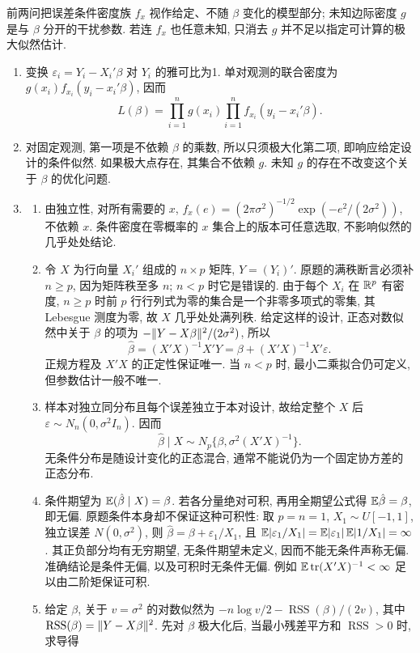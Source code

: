 \begin{solution}
前两问把误差条件密度族 $f_x$ 视作给定、不随 $\beta$ 变化的模型部分; 未知边际密度 $g$ 是与 $\beta$ 分开的干扰参数. 若连 $f_x$ 也任意未知, 只消去 $g$ 并不足以指定可计算的极大似然估计.
\begin{enumerate}[label=\arabic*.]
\item 变换 $\varepsilon_i=Y_i-X_i'\beta$ 对 $Y_i$ 的雅可比为1. 单对观测的联合密度为 $g(x_i)f_{x_i}(y_i-x_i'\beta)$, 因而
\[
L(\beta)=\prod_{i=1}^ng(x_i)\prod_{i=1}^nf_{x_i}(y_i-x_i'\beta).
\]
\item 对固定观测, 第一项是不依赖 $\beta$ 的乘数, 所以只须极大化第二项, 即响应给定设计的条件似然. 如果极大点存在, 其集合不依赖 $g$. 未知 $g$ 的存在不改变这个关于 $\beta$ 的优化问题.
\item
\begin{enumerate}[label=\alph*)]
\item 由独立性, 对所有需要的 $x$, $f_x(e)=(2\pi\sigma^2)^{-1/2}\exp(-e^2/(2\sigma^2))$, 不依赖 $x$. 条件密度在零概率的 $x$ 集合上的版本可任意选取, 不影响似然的几乎处处结论.
\item 令 $X$ 为行向量 $X_i'$ 组成的 $n\times p$ 矩阵, $Y=(Y_i)'$. 原题的满秩断言必须补 $n\ge p$, 因为矩阵秩至多 $n$; $n<p$ 时它是错误的. 由于每个 $X_i$ 在 $\mathbb R^p$ 有密度, $n\ge p$ 时前 $p$ 行行列式为零的集合是一个非零多项式的零集, 其 Lebesgue 测度为零, 故 $X$ 几乎处处满列秩. 给定这样的设计, 正态对数似然中关于 $\beta$ 的项为 $-\lVert Y-X\beta\rVert^2/(2\sigma^2)$, 所以
\[
\hat\beta=(X'X)^{-1}X'Y=\beta+(X'X)^{-1}X'\varepsilon.
\]
正规方程及 $X'X$ 的正定性保证唯一. 当 $n<p$ 时, 最小二乘拟合仍可定义, 但参数估计一般不唯一.
\item 样本对独立同分布且每个误差独立于本对设计, 故给定整个 $X$ 后 $\varepsilon\sim N_n(0,\sigma^2I_n)$. 因而
\[
\hat\beta\mid X\sim N_p\{\beta,\sigma^2(X'X)^{-1}\}.
\]
无条件分布是随设计变化的正态混合, 通常不能说仍为一个固定协方差的正态分布.
\item 条件期望为 $\mathbb E(\hat\beta\mid X)=\beta$. 若各分量绝对可积, 再用全期望公式得 $\mathbb E\hat\beta=\beta$, 即无偏. 原题条件本身却不保证这种可积性: 取 $p=n=1$, $X_1\sim U[-1,1]$, 独立误差 $N(0,\sigma^2)$, 则 $\hat\beta=\beta+\varepsilon_1/X_1$, 且
$\mathbb E|\varepsilon_1/X_1|=\mathbb E|\varepsilon_1|\,\mathbb E|1/X_1|=\infty$.
其正负部分均有无穷期望, 无条件期望未定义, 因而不能无条件声称无偏. 准确结论是条件无偏, 以及可积时无条件无偏. 例如 $\mathbb E\operatorname{tr}(X'X)^{-1}<\infty$ 足以由二阶矩保证可积.
\item 给定 $\beta$, 关于 $v=\sigma^2$ 的对数似然为 $-n\log v/2-\operatorname{RSS}(\beta)/(2v)$, 其中 $\operatorname{RSS}(\beta)=\lVert Y-X\beta\rVert^2$. 先对 $\beta$ 极大化后, 当最小残差平方和 $\operatorname{RSS}>0$ 时, 求导得

\end{enumerate}
\end{enumerate}
\end{solution}
